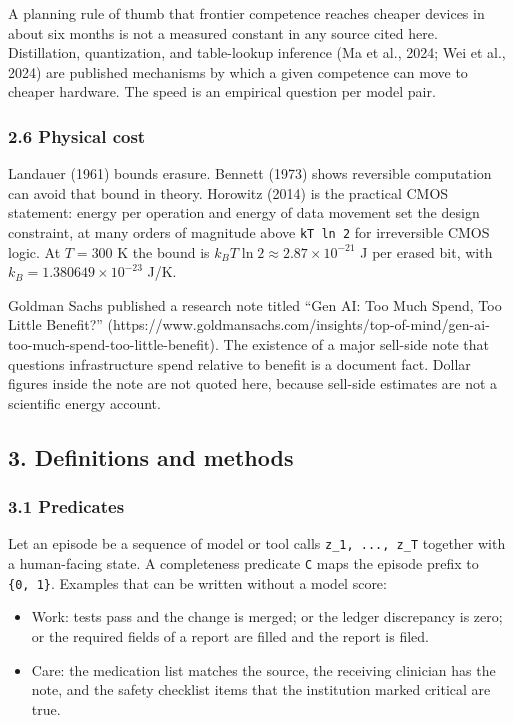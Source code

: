 \documentclass[
  10pt,
]{article}
\providecommand{\tightlist}{%
  \setlength{\itemsep}{0pt}\setlength{\parskip}{0pt}}
\begin{document}
A planning rule of thumb that frontier competence reaches cheaper
devices in about six months is not a measured constant in any source
cited here. Distillation, quantization, and table-lookup inference (Ma
et al., 2024; Wei et al., 2024) are published mechanisms by which a
given competence can move to cheaper hardware. The speed is an empirical
question per model pair.

\subsubsection{2.6 Physical cost}\label{physical-cost}

Landauer (1961) bounds erasure. Bennett (1973) shows reversible
computation can avoid that bound in theory. Horowitz (2014) is the
practical CMOS statement: energy per operation and energy of data
movement set the design constraint, at many orders of magnitude above
\texttt{kT\ ln\ 2} for irreversible CMOS logic. At \(T = 300\) K the
bound is \(k_B T \ln 2 \approx 2.87 \times 10^{-21}\) J per erased bit,
with \(k_B = 1.380649 \times 10^{-23}\) J/K.

Goldman Sachs published a research note titled ``Gen AI: Too Much Spend,
Too Little Benefit?''
(https://www.goldmansachs.com/insights/top-of-mind/gen-ai-too-much-spend-too-little-benefit).
The existence of a major sell-side note that questions infrastructure
spend relative to benefit is a document fact. Dollar figures inside the
note are not quoted here, because sell-side estimates are not a
scientific energy account.

\subsection{3. Definitions and methods}\label{definitions-and-methods}

\subsubsection{3.1 Predicates}\label{predicates}

Let an episode be a sequence of model or tool calls
\texttt{z\_1,\ ...,\ z\_T} together with a human-facing state. A
completeness predicate \texttt{C} maps the episode prefix to
\texttt{\{0,\ 1\}}. Examples that can be written without a model score:

\begin{itemize}
\tightlist
\item
  Work: tests pass and the change is merged; or the ledger discrepancy
  is zero; or the required fields of a report are filled and the report
  is filed.
\item
  Care: the medication list matches the source, the receiving clinician
  has the note, and the safety checklist items that the institution
  marked critical are true.
\end{itemize}
\end{document}

